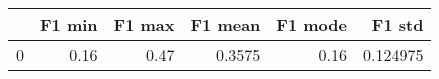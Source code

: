 \begin{tabular}{lrrrrr}
\toprule
{} &  F1 min &  F1 max &  F1 mean &  F1 mode &    F1 std \\
\midrule
0 &    0.16 &    0.47 &   0.3575 &     0.16 &  0.124975 \\
\bottomrule
\end{tabular}
